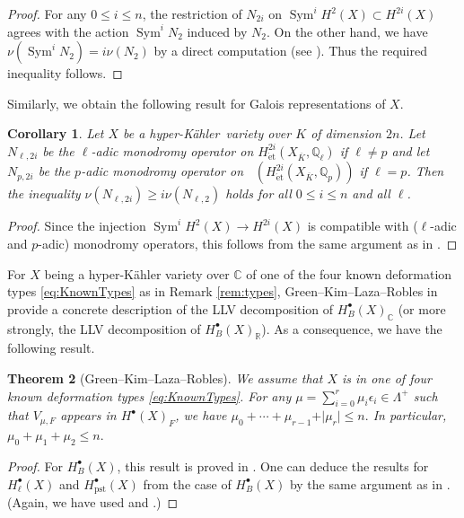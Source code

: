 \documentclass[12pt,reqno]{amsart}
\newtheorem{thm}{Theorem}[section]
\newtheorem{cor}[thm]{Corollary}
\theoremstyle{definition}
\newcommand{\Q}{{\mathds Q}}
\newcommand{\R}{{\mathds R}}
\newcommand{\C}{{\mathds C}}
\DeclareMathOperator{\Dpst}{\mathit{D}_{\mathrm{pst}}}
\newcommand\Sym{\mathop{\mathrm{Sym}}\nolimits}
\newcommand{\et}{\mathrm{\acute{e}t}}
\newcommand{\hk}{hyper-Kähler~}
\DeclareMathOperator{\pst}{pst}
\numberwithin{equation}{section}
\begin{document}
\begin{proof}
For any $0 \leq i \leq n$, the restriction of $N_{2i}$ on $\Sym^i H^2(X) \subset H^{2i}(X)$ agrees with the action $\Sym^i N_2$ induced by $N_2$.
On the other hand, we have $\nu (\Sym^i N_2) =i \nu(N_2)$ by a direct computation (see \cite[Lemma 5.6]{GKLR}). Thus the required inequality follows.
\end{proof}

Similarly, we obtain the following result for Galois representations of $X$.
\begin{cor}\label{cor:lower bound of monodromy operators}
    Let $X$ be a \hk variety over $K$ of dimension $2n$.
    Let
$N_{\ell, 2i}$
be
the $\ell$-adic monodromy operator on $H^{2i}_{\et} (X_{\overline{K}}, \Q_{\ell})$
if $\ell \neq p$
and
let
$N_{p, 2i}$
be the $p$-adic monodromy operator on
$\Dpst(H^{2i}_{\et} (X_{\overline{K}}, \Q_{p}))$ if $\ell = p$.
    Then the inequality
$
\nu(N_{\ell, 2i}) \geq i \nu(N_{\ell, 2})
$
holds for all $0 \leq i \leq n$ and all $\ell$.
\end{cor}

\begin{proof}
    Since the injection
    $\Sym^{i}H^2(X) \to H^{2i}(X)$ 
    is compatible with ($\ell$-adic and $p$-adic) monodromy operators,
    this follows from the same argument as in .
\end{proof}



For $X$ being a hyper-Kähler variety over $\C$ of one of the four known deformation types \eqref{eq:KnownTypes} as in Remark \ref{rem:types},
Green--Kim--Laza--Robles
in \cite{GKLR}
provide
a concrete description of the LLV decomposition of
$H^{\bullet}_B(X)_\C$
(or more strongly, the LLV decomposition of
$H^{\bullet}_B(X)_\R$).
As a consequence, we have the following result.

\begin{thm}[Green--Kim--Laza--Robles]
\label{thm:LLVdecompositionmu}
We assume that $X$ is in one of four known deformation types \eqref{eq:KnownTypes}.
For any $\mu= \sum_{i=0}^{r} \mu_i \epsilon_i \in \Lambda^+$ such that $V_{\mu, F}$ appears in $H^\bullet (X)_F$, we have
$
	\mu_0 +  \cdots + \mu_{r-1} + \vert \mu_{r} \vert \leq n.
$
In particular, 
$
\mu_0 + \mu_1 + \mu_2 \leq n.
$
\end{thm}

\begin{proof}
For $H^\bullet_B(X)$, this result is proved in \cite[Theorem 6.1]{GKLR}.
One can deduce the results for $H^\bullet_\ell(X)$ and $H^\bullet_{\pst}(X)$ from the case of $H^\bullet_B(X)$ by the same argument as in .
(Again, we have used 
and
.)
\end{proof}
\end{document}
